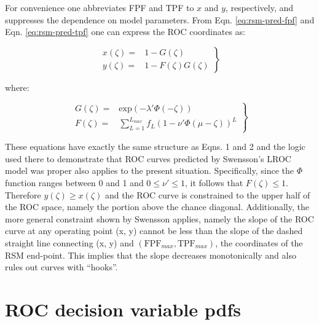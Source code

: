 \documentclass[
]{book}
\begin{document}
For convenience one abbreviates FPF and TPF to \(x\) and \(y\), respectively, and suppresses the dependence on model parameters. From Eqn. \eqref{eq:rsm-pred-fpf} and Eqn. \eqref{eq:rsm-pred-tpf} one can express the ROC coordinates as:

\begin{equation}
\left. 
\begin{aligned}
x\left ( \zeta \right ) =& 1 - G\left ( \zeta \right )\\
y\left ( \zeta \right ) =& 1 - F\left ( \zeta \right ) G\left ( \zeta \right ) 
\end{aligned}
\right \}
\label{eq:rsm-pred-f-g}
\end{equation}

where:

\begin{equation}
\left. 
\begin{aligned}
G\left ( \zeta \right ) =& \text{exp}\left ( -\lambda' \Phi \left ( -\zeta \right )\right )\\
F\left ( \zeta \right ) =& \sum_{L=1}^{L_{max}} f_L  \left ( 1 - \nu' \Phi \left ( \mu -\zeta \right ) \right )^L 
\end{aligned}
\right \}
\label{eq:rsm-pred-fg-defs}
\end{equation}

These equations have exactly the same structure as \citep{swensson1996unified} Eqns. 1 and 2 and the logic used there to demonstrate that ROC curves predicted by Swensson's LROC model was proper also applies to the present situation. Specifically, since the \(\Phi\) function ranges between 0 and 1 and \(0 \leq \nu' \leq 1\), it follows that \(F\left ( \zeta \right ) \leq 1\). Therefore \(y\left ( \zeta \right ) \geq x\left ( \zeta \right )\) and the ROC curve is constrained to the upper half of the ROC space, namely the portion above the chance diagonal. Additionally, the more general constraint shown by Swensson applies, namely the slope of the ROC curve at any operating point (x, y) cannot be less than the slope of the dashed straight line connecting (x, y) and \(\left (\text{FPF}_{max}, \text{TPF}_{max} \right )\), the coordinates of the RSM end-point. This implies that the slope decreases monotonically and also rules out curves with ``hooks''.

\hypertarget{rsm-pred-roc-curve-pdfs}{%
\section{ROC decision variable pdfs}\label{rsm-pred-roc-curve-pdfs}}
\end{document}
